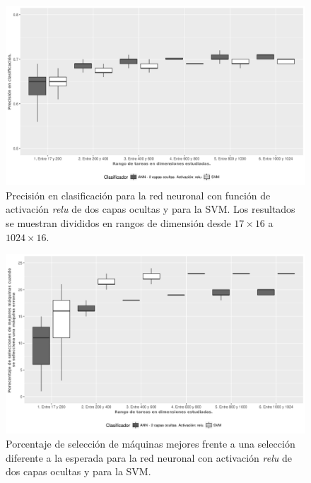 \begin{figure}[H]
  \centering
  \includegraphics[width=\columnwidth]{imagenes/relu/3_accuracy_ann_2_capas_ocultas_relu.png}
  \caption{Precisión en clasificación para la red neuronal con función de activación \textit{relu} de dos capas ocultas y para la SVM.
Los resultados se muestran divididos en rangos de dimensión desde $ 17 \times 16$ a $ 1024 \times 16$.}
  \label{fig:relu_accuracy}
\end{figure}

\newpage %

\begin{figure}[H]
  \centering
  \includegraphics[width=\columnwidth]{imagenes/relu/4_porcentaje_maquinas_mejores_ann_2_capas_ocultas_relu.png}
  \caption{Porcentaje de selección de máquinas mejores frente a una selección diferente a la esperada para la red neuronal con activación \textit{relu} de dos capas ocultas y para la SVM.}
  \label{fig:relu_maquinas_mejores}
\end{figure}

